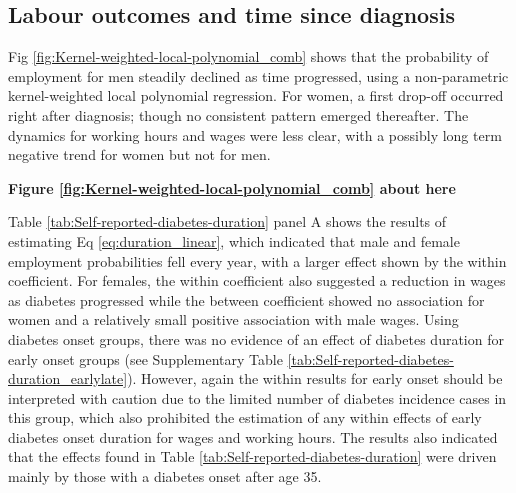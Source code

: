 \documentclass[10pt,letterpaper]{article}
\begin{document}
\subsection*{\label{sec:duration}Labour outcomes and time since diagnosis }

Fig \ref{fig:Kernel-weighted-local-polynomial_comb} shows that the probability of employment for men steadily declined as time progressed, using a non-parametric kernel-weighted local polynomial regression. For women, a first drop-off occurred right after diagnosis; though no consistent pattern emerged thereafter. The dynamics for working hours and wages were less clear, with a possibly long term negative trend for women but not for men.

\begin{center}
	\textbf{Figure \ref{fig:Kernel-weighted-local-polynomial_comb} about here}
\end{center}


Table \ref{tab:Self-reported-diabetes-duration} panel A shows the results of estimating Eq \ref{eq:duration_linear}, which indicated that male and female employment probabilities fell every year, with a larger effect shown by the within coefficient. For females, the within coefficient also suggested a reduction in wages as diabetes progressed while the between coefficient showed no association for women and a relatively small positive association with male wages. Using diabetes onset groups, there was no evidence of an effect of diabetes duration for early onset groups (see Supplementary Table \ref{tab:Self-reported-diabetes-duration_earlylate}). However, again the within results for early onset should be interpreted with caution due to the limited number of diabetes incidence cases in this group, which also prohibited the estimation of any within effects of early diabetes onset duration for wages and working hours. The results also indicated that the effects found in Table \ref{tab:Self-reported-diabetes-duration} were driven mainly by those with a diabetes onset after age 35.
\end{document}
